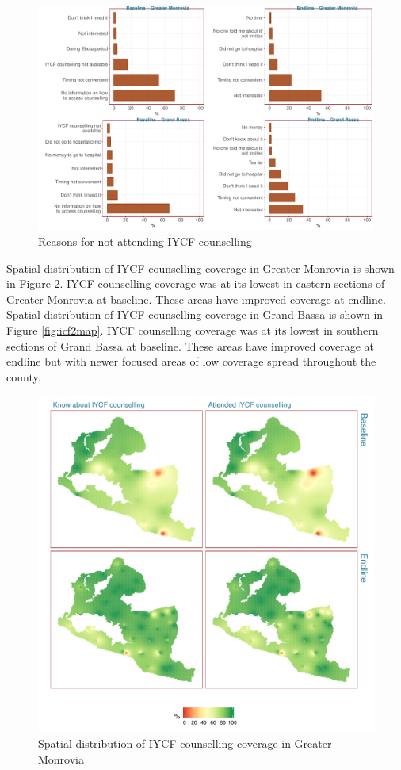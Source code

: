 \documentclass[12pt,a4paper]{article}
\begin{document}
\begin{figure}[H]

{\centering \includegraphics{liberiaCoverageFinalReport_files/figure-latex/icf2table-1} 

}

\caption{Reasons for not attending IYCF counselling}\label{fig:icf2table}
\end{figure}

Spatial distribution of IYCF counselling coverage in Greater Monrovia is shown in Figure \ref{fig:icf1map}. IYCF counselling coverage was at its lowest in eastern sections of Greater Monrovia at baseline. These areas have improved coverage at endline. Spatial distribution of IYCF counselling coverage in Grand Bassa is shown in Figure \ref{fig:icf2map}. IYCF counselling coverage was at its lowest in southern sections of Grand Bassa at baseline. These areas have improved coverage at endline but with newer focused areas of low coverage spread throughout the county.

\begin{figure}[H]

{\centering \includegraphics[width=0.65\linewidth]{liberiaCoverageFinalReport_files/figure-latex/icf1map-1} 

}

\caption{Spatial distribution of IYCF counselling coverage in Greater Monrovia}\label{fig:icf1map}
\end{figure}
\end{document}
